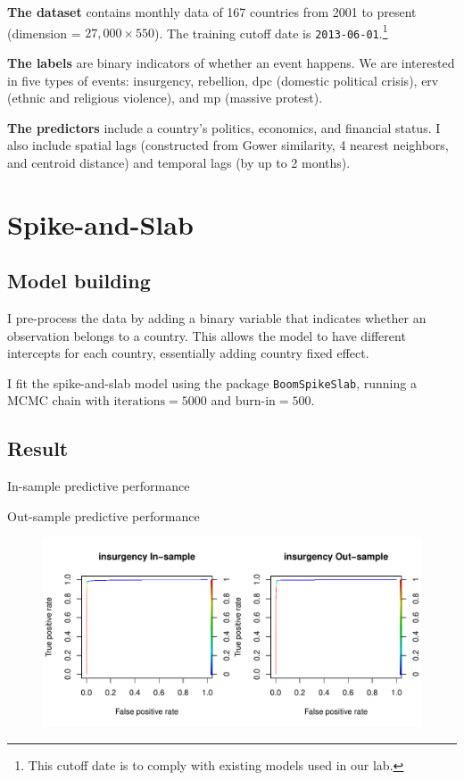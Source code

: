 \documentclass{article}
\begin{document}
\textbf{The dataset} contains monthly data of 167 countries from 2001 to present (dimension = $27,000 \times 550$). The training cutoff date is \verb|2013-06-01|.\footnote{This cutoff date is to comply with existing models used in our lab.}

\textbf{The labels} are binary indicators of whether an event happens. We are interested in five types of events: insurgency, rebellion, dpc (domestic political crisis), erv (ethnic and religious violence), and mp (massive protest).

\textbf{The predictors} include a country's politics, economics, and financial status. I also include spatial lags (constructed from Gower similarity, 4 nearest neighbors, and centroid distance) and temporal lags (by up to 2 months).

\section{Spike-and-Slab}

\subsection{Model building}
I pre-process the data by adding a binary variable that indicates whether an observation belongs to a country. This allows the model to have different intercepts for each country, essentially adding country fixed effect.

I fit the spike-and-slab model using the package \verb|BoomSpikeSlab|, running a MCMC chain with $\text{iterations}=5000$ and $\text{burn-in}=500$. 

\subsection*{Result}


\begin{table}[H]
\centering

\caption{In-sample predictive performance}
\end{table}

\begin{table}[H]
\centering

\caption{Out-sample predictive performance}
\end{table}



\begin{figure}[H]
\includegraphics[width=\textwidth]{fig/roc_insurgency}
\end{figure}
\end{document}
